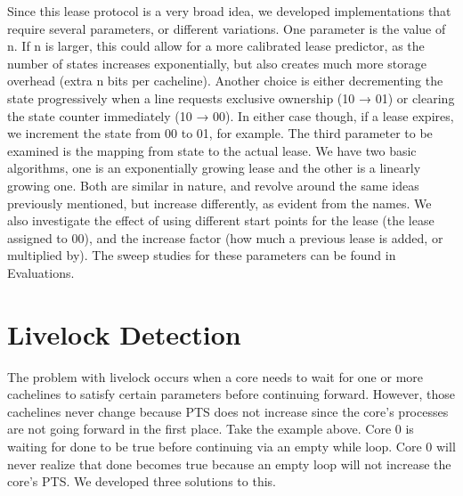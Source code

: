 \documentclass[12pt]{article}
\begin{document}
Since this lease protocol is a very broad idea, we developed implementations that require several parameters, or different variations. One parameter is the value of n. If n is larger, this could allow for a more calibrated lease predictor, as the number of states increases exponentially, but also creates much more storage overhead (extra n bits per cacheline). Another choice is either decrementing the state progressively when a line requests exclusive ownership (10 → 01) or clearing the state counter immediately (10 → 00). In either case though, if a lease expires, we increment the state from 00 to 01, for example. The third parameter to be examined is the mapping from state to the actual lease. We have two basic algorithms, one is an exponentially growing lease and the other is a linearly growing one. Both are similar in nature, and revolve around the same ideas previously mentioned, but increase differently, as evident from the names. We also investigate the effect of using different start points for the lease (the lease assigned to 00), and the increase factor (how much a previous lease is added, or multiplied by). The sweep studies for these parameters can be found in Evaluations.

\section{Livelock Detection}

The problem with livelock occurs when a core needs to wait for one or more cachelines to satisfy certain parameters before continuing forward. However, those cachelines never change because PTS does not increase since the core’s processes are not going forward in the first place. Take  the example above. Core 0 is waiting for done to be true before continuing via an empty while loop. Core 0 will never realize that done becomes true because an empty loop will not increase the core’s PTS. We developed three solutions to this.
\end{document}
